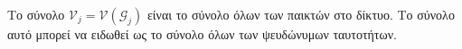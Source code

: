 {}
\begin{definition}[Παίκτες]
  Το σύνολο $\mathcal{V}_j = \mathcal{V}\left(\mathcal{G}_j\right)$ είναι το σύνολο όλων των παικτών στο δίκτυο. Το σύνολο
  αυτό μπορεί να ειδωθεί ως το σύνολο όλων των ψευδώνυμων ταυτοτήτων.
\end{definition}
